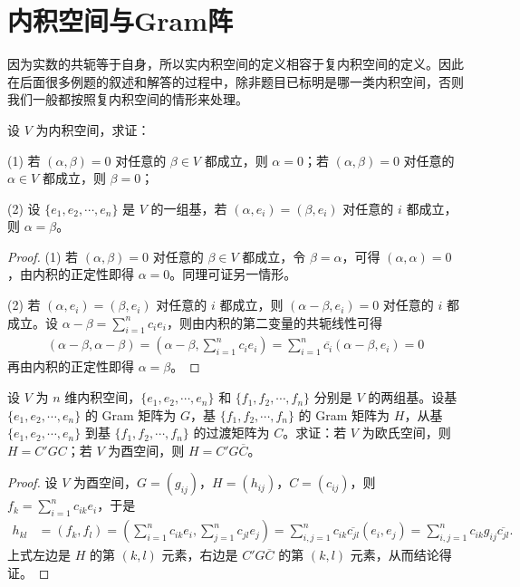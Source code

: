 \documentclass[../../main.tex]{subfiles}%
\begin{document}
\section{内积空间与Gram阵}

\begin{remark}
因为实数的共轭等于自身，所以实内积空间的定义相容于复内积空间的定义。因此在后面很多例题的叙述和解答的过程中，除非题目已标明是哪一类内积空间，否则我们一般都按照复内积空间的情形来处理。
\end{remark}

\begin{proposition}\label{proposition:例9.2}
设 $V$ 为内积空间，求证：

(1) 若 $(\alpha,\beta)=0$ 对任意的 $\beta\in V$ 都成立，则 $\alpha = 0$；若 $(\alpha,\beta)=0$ 对任意的 $\alpha\in V$ 都成立，则 $\beta = 0$；

(2) 设 $\{e_1,e_2,\cdots,e_n\}$ 是 $V$ 的一组基，若 $(\alpha,e_i)=(\beta,e_i)$ 对任意的 $i$ 都成立，则 $\alpha = \beta$。
\end{proposition}
\begin{proof}
(1) 若 $(\alpha,\beta)=0$ 对任意的 $\beta\in V$ 都成立，令 $\beta = \alpha$，可得 $(\alpha,\alpha)=0$，由内积的正定性即得 $\alpha = 0$。同理可证另一情形。

(2) 若 $(\alpha,e_i)=(\beta,e_i)$ 对任意的 $i$ 都成立，则 $(\alpha - \beta,e_i)=0$ 对任意的 $i$ 都成立。设 $\alpha - \beta = \sum_{i = 1}^{n}c_ie_i$，则由内积的第二变量的共轭线性可得
\begin{align*}
(\alpha - \beta,\alpha - \beta)=(\alpha - \beta,\sum_{i = 1}^{n}c_ie_i)=\sum_{i = 1}^{n}\overline{c_i}(\alpha - \beta,e_i)=0
\end{align*}
再由内积的正定性即得 $\alpha = \beta$。
\end{proof}

\begin{proposition}\label{proposition:例9.3}
设 $V$ 为 $n$ 维内积空间，$\{e_1,e_2,\cdots,e_n\}$ 和 $\{f_1,f_2,\cdots,f_n\}$ 分别是 $V$ 的两组基。设基 $\{e_1,e_2,\cdots,e_n\}$ 的 Gram 矩阵为 $G$，基 $\{f_1,f_2,\cdots,f_n\}$ 的 Gram 矩阵为 $H$，从基 $\{e_1,e_2,\cdots,e_n\}$ 到基 $\{f_1,f_2,\cdots,f_n\}$ 的过渡矩阵为 $C$。求证：若 $V$ 为欧氏空间，则 $H = C'GC$；若 $V$ 为酉空间，则 $H = C' G\overline{C}$。
\end{proposition}
\begin{proof}
设 $V$ 为酉空间，$G = (g_{ij})$，$H = (h_{ij})$，$C = (c_{ij})$，则 $f_k = \sum_{i = 1}^{n}c_{ik}e_i$，于是
\begin{align*}
h_{kl}&=(f_k,f_l)=(\sum_{i = 1}^{n}c_{ik}e_i,\sum_{j = 1}^{n}c_{jl}e_j)=\sum_{i,j = 1}^{n}c_{ik}\overline{c_{jl}}(e_i,e_j)=\sum_{i,j = 1}^{n}c_{ik}g_{ij}\overline{c_{jl}}.
\end{align*}
上式左边是 $H$ 的第 $(k, l)$ 元素，右边是 $C' G\overline{C}$ 的第 $(k, l)$ 元素，从而结论得证。
\end{proof}
\end{document}
